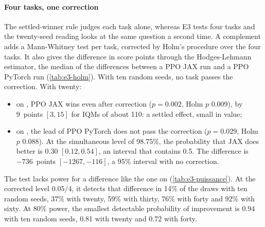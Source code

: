 \paragraph{Four tasks, one correction}
The settled-winner rule judges each task alone, whereas E3 tests four tasks and the twenty-seed reading looks
at the same question a second time. A complement adds a Mann-Whitney test
per task, corrected by Holm's procedure over the four tasks. It also gives the difference in score points through
the Hodges-Lehmann estimator, the median of the differences between a PPO JAX run and a PPO PyTorch run
(\cref{tab:e3-holm}). With ten random seeds, no task passes the correction. With twenty:
\begin{itemize}
  \item on , PPO JAX wins even after correction ($p = 0.002$, Holm $p$ 0.009), by
    9~points $[3, 15]$ for IQMs of about 110: a settled effect, small in value;
  \item on , the lead of PPO PyTorch does not pass the correction ($p = 0.029$, Holm $p$
    0.088). At the simultaneous level of 98.75\%, the probability that JAX does better is 0.30
    $[0.12, 0.54]$, an interval that contains 0.5. The difference is $-736$~points $[-\num{1267}, -116]$, a 95\%
    interval with no correction.
\end{itemize}
The test lacks power for a difference like the one on  (\cref{tab:e3-puissance}). At the corrected
level $0.05/4$, it detects that difference in 14\% of the draws with ten random seeds, 37\% with twenty, 59\% with
thirty, 76\% with forty and 92\% with sixty. At 80\% power, the smallest detectable probability of improvement
is 0.94 with ten random seeds, 0.81 with twenty and 0.72 with forty.



